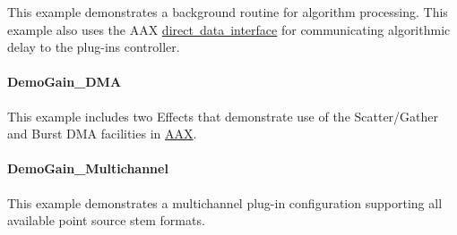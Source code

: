 This example demonstrates a background routine for algorithm processing. This example also uses the A\+AX \mbox{\hyperlink{a00803}{direct data interface}} for communicating algorithmic delay to the plug-\/in\textquotesingle{}s controller.\hypertarget{a00848_DemoGain_DMA}{}\paragraph{Demo\+Gain\+\_\+\+D\+MA}\label{a00848_DemoGain_DMA}
This example includes two Effects that demonstrate use of the Scatter/\+Gather and Burst D\+MA facilities in \mbox{\hyperlink{a00852}{A\+AX}}.\hypertarget{a00848_DemoGain_Multichannel}{}\paragraph{Demo\+Gain\+\_\+\+Multichannel}\label{a00848_DemoGain_Multichannel}
This example demonstrates a multichannel plug-\/in configuration supporting all available point source stem formats.

